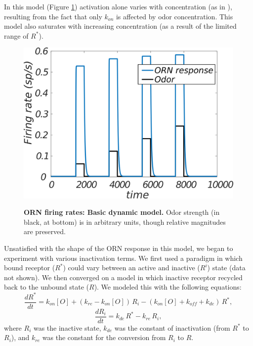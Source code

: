 \documentclass[a4paper,12pt,twoside]{article}
\begin{document}
In this model (Figure \ref{fig:orn3}) activation alone varies with concentration (as in \cite{Nagel2011}), resulting from the fact that only $k_{on}$ is affected by odor concentration.  This model also saturates with increasing concentration (as a result of the limited range of $R^*$).

\begin{figure}
\centering
\caption{\textbf{ORN firing rates: Basic dynamic model.}  Odor strength (in black, at bottom) is in arbitrary units, though relative magnitudes are preserved.\newline}
\hspace*{-1cm}
\includegraphics[scale=0.7]{2016-08-05DynORNnoInactivation.png}
\label{fig:orn3}
\end{figure}
Unsatisfied with the shape of the ORN response in this model, we began to experiment with various inactivation terms.  We first used a paradigm in which bound receptor ($R^*$) could vary between an active and inactive ($R^i$) state (data not shown).  We then converged on a model in which inactive receptor recycled back to the unbound state ($R$).  We modeled this with the following equations:
\begin{equation}
\frac{dR^*}{dt} = k_{on}[O] + (k_{re} - k_{on}[O])\,R_i - (k_{on}[O] + k_{off} + k_{de})\,R^*,
\end{equation}
\begin{equation}
\frac{dR_i}{dt} = k_{de} \,R^* - k_{re}\, R_i,
\end{equation}
where $R_i$ was the inactive state, $k_{de}$ was the constant of inactivation (from $R^*$ to $R_i$), and $k_{re}$ was the constant for the conversion from $R_i$ to $R.$  
\end{document}
